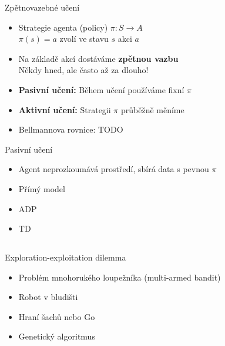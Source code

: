 \documentclass{beamer}
\begin{document}
\begin{frame}{Zpětnovazebné učení}
\begin{itemize}
\item Strategie agenta (policy) $\pi\colon S \to A$ \\ $\pi(s)=a$ zvolí ve stavu $s$ akci $a$
\item Na základě akcí dostáváme {\bf zpětnou vazbu} \\ Někdy hned, ale často až za dlouho!
\item {\bf Pasivní učení:} Během učení používáme fixní $\pi$
\item {\bf Aktivní učení:} Strategii $\pi$ průběžně měníme
\item Bellmannova rovnice: TODO
\end{itemize}
\end{frame}

\begin{frame}{Pasivní učení}
\begin{itemize}
\item Agent neprozkoumává prostředí, sbírá data s pevnou $\pi$
\item Přímý model
\item ADP
\item TD
\end{itemize}
\end{frame}

\subsection{}

\subsection{}
\begin{frame}{Exploration-exploitation dilemma}
\begin{itemize}
\item Problém mnohorukého loupežníka (multi-armed bandit)
\item Robot v bludišti
\item Hraní šachů nebo Go
\item Genetický algoritmus
\end{itemize}
\end{frame}
\end{document}
